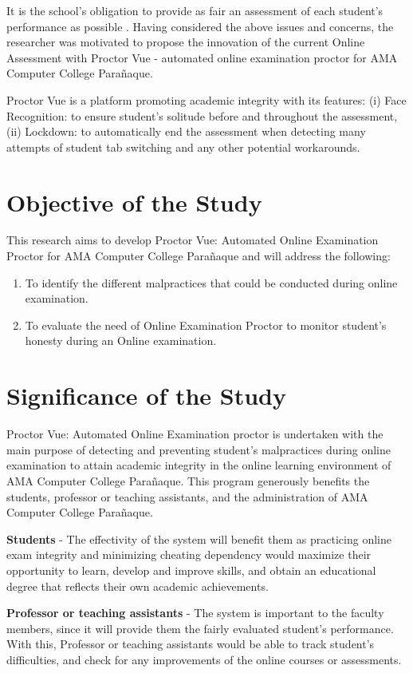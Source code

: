 It is the school’s obligation to provide as fair an assessment of each student’s performance as possible \cite{lundahl2010skolbedomningens}.
Having considered the above issues and concerns, the researcher was motivated to propose the innovation of the current Online Assessment with Proctor Vue - automated online examination proctor for AMA Computer College Parañaque.

Proctor Vue is a platform promoting academic integrity with its features: (i) Face Recognition: to ensure student’s solitude before and throughout the assessment, (ii) Lockdown: to automatically end the assessment when detecting many attempts of student tab switching and any other potential workarounds.

\section{Objective of the Study}
This research aims to develop Proctor Vue: Automated Online Examination Proctor for AMA Computer College Parañaque and will address the following:
\begin{enumerate}
    \item To identify the different malpractices that could be conducted during online examination.
    \item To evaluate the need of Online Examination Proctor to monitor student's honesty during an Online examination.
\end{enumerate}

\section{Significance of the Study}

Proctor Vue: Automated Online Examination proctor is undertaken with the main purpose of detecting and preventing student’s malpractices during online examination to attain academic integrity in the online learning environment of AMA Computer College Parañaque. This program generously benefits the students, professor or teaching assistants, and the administration of AMA Computer College Parañaque.

\textbf{Students} - The effectivity of the system will benefit them as practicing online exam integrity and minimizing cheating dependency would maximize their opportunity to learn, develop and improve skills, and obtain an educational degree that reflects their own academic achievements.

\textbf{Professor or teaching assistants} - The system is important to the faculty members, since it will provide them the fairly evaluated student’s performance. With this, Professor or teaching assistants would be able to track student’s difficulties, and check for any improvements of the online courses or assessments.

